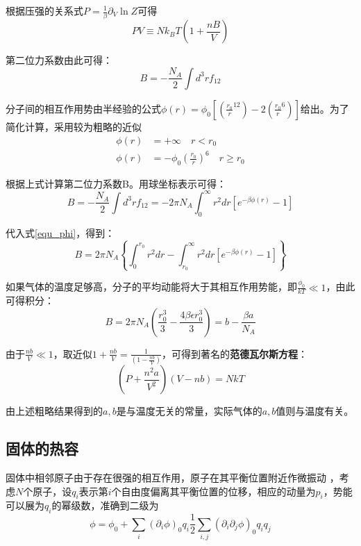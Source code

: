\documentclass[UTF8]{ctexart}
\begin{document}
	根据压强的关系式$ P=\frac{1}{\beta} \partial_{V} \ln Z $可得
	\begin{equation}
	P V \equiv N k_{B} T\left(1+\frac{n B}{V}\right)
	\end{equation}
	
\noindent 第二位力系数由此可得：
\begin{equation}
B=-\frac{N_{A}}{2} \int d^{3} r f_{12}
\end{equation}

	分子间的相互作用势由半经验的公式$ \phi(r)=\phi_{0} \left[\left(\frac{r_{0}}{r}^{12}\right)-2 \left(\frac{r_{0}}{r}^{6}\right)\right] $给出。为了简化计算，采用较为粗略的近似
	\begin{equation}
	\begin{aligned}
	\phi(r)&=+\infty \quad r<r_{0}\\
	\phi(r)&=-\phi_{0} \left(\frac{r_{0}}{r}\right)^{6} \quad r \geq r_{0}
	\end{aligned}\label{equ_phi}
	\end{equation}
	
	根据上式计算第二位力系数B。用球坐标表示可得：
	\begin{equation}
	B=-\frac{N_{A}}{2} \int d^{3} r f_{12}=-2 \pi N_{A} \int_{0}^{\infty} r^{2} d r\left[e^{-\beta \phi(r)}-1\right]
	\end{equation}
	
\noindent 代入式\ref{equ_phi}，得到：
\begin{equation}
B=2 \pi N_{A}\left\{\int_{0}^{r_{0}} r^{2} d r-\int_{r_{0}}^{\infty} r^{2} d r\left[e^{-\beta \phi(r)}-1\right]\right\}
\end{equation}

\noindent 如果气体的温度足够高，分子的平均动能将大于其相互作用势能，即$ \frac{\phi_{0}}{k T} \ll 1 $，由此可得积分：
\begin{equation}
B=2 \pi N_{A}\left(\frac{r_{0}^{3}}{3}-\frac{4 \beta \epsilon r_{0}^{3}}{3}\right)=b-\frac{\beta a}{N_{A}}
\end{equation}

\noindent 由于$ \frac{n b}{V} \ll 1 $，取近似$ 1+\frac{n b}{V}=\frac{1}{\left(1- \frac{n b}{V}\right)} $，可得到著名的\textbf{范德瓦尔斯方程}：
\begin{equation}
\left(P+\frac{n^{2} a}{V^{2}}\right)(V-n b)=NkT
\end{equation}

\noindent 由上述粗略结果得到的$ a,b $是与温度无关的常量，实际气体的$ a,b $值则与温度有关。

	\subsection{固体的热容}
	固体中相邻原子由于存在很强的相互作用，原子在其平衡位置附近作微振动 ，考虑$ N $个原子，设$ q_{i} $表示第$ i $个自由度偏离其平衡位置的位移，相应的动量为$ p_{i} $，势能可以展为$ q_{i} $的幂级数，准确到二级为
	\begin{equation}
	\phi=\phi_{0}+ \sum_{i} \left(\partial_{i} \phi \right)_{0} q_{i} \frac{1}{2} \sum_{i, j}\left(\partial_{i} \partial_{j} \phi\right)_{0} q_{i} q_{j}
	\end{equation}
	
\end{document}
